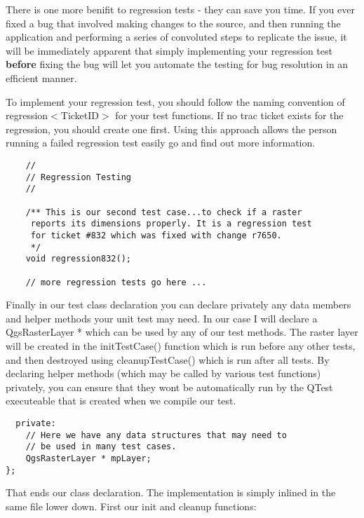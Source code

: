 There is one more benifit to regression tests - they can save you time. 
If you ever fixed a bug that involved making changes to the source, 
and then running the application and performing a series of convoluted 
steps to replicate the issue, it will be immediately apparent that 
simply implementing your regression test \textbf{before} fixing the bug 
will let you automate the testing for bug resolution in an efficient 
manner.

To implement your regression test, you should follow the naming 
convention of regression$<$TicketID$>$ for your test functions. If no 
trac ticket exists for the regression, you should create one first. 
Using this approach allows the person running a failed regression 
test easily go and find out more information.

\begin{verbatim}
    //
    // Regression Testing
    //
    
    /** This is our second test case...to check if a raster
     reports its dimensions properly. It is a regression test 
     for ticket #832 which was fixed with change r7650. 
     */
    void regression832(); 
  
    // more regression tests go here ...
\end{verbatim}

Finally in our test class declaration you can declare privately 
any data members and helper methods your unit test may need. In our 
case I will declare a QgsRasterLayer * which can be used by any 
of our test methods. The raster layer will be created in the 
initTestCase() function which is run before any other tests, and then
destroyed using cleanupTestCase() which is run after all tests. By 
declaring helper methods (which may be called by various test 
functions) privately, you can ensure that they wont be automatically 
run by the QTest executeable that is created when we compile our test.

\begin{verbatim}
  private:
    // Here we have any data structures that may need to 
    // be used in many test cases.
    QgsRasterLayer * mpLayer;
};

\end{verbatim}

That ends our class declaration. The implementation is simply 
inlined in the same file lower down. First our init and cleanup functions:

